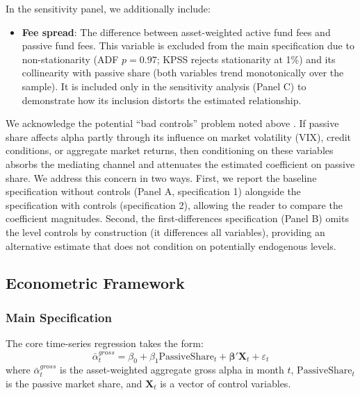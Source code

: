 \documentclass[11pt, a4paper]{article}
\begin{document}
In the sensitivity panel, we additionally include:
\begin{itemize}[noitemsep]
    \item \textbf{Fee spread}: The difference between asset-weighted active fund fees and passive fund fees. This variable is excluded from the main specification due to non-stationarity (ADF $p = 0.97$; KPSS rejects stationarity at 1\%) and its collinearity with passive share (both variables trend monotonically over the sample). It is included only in the sensitivity analysis (Panel C) to demonstrate how its inclusion distorts the estimated relationship.
\end{itemize}

We acknowledge the potential ``bad controls'' problem noted above \parencite{angrist2009}. If passive share affects alpha partly through its influence on market volatility (VIX), credit conditions, or aggregate market returns, then conditioning on these variables absorbs the mediating channel and attenuates the estimated coefficient on passive share. We address this concern in two ways. First, we report the baseline specification without controls (Panel A, specification 1) alongside the specification with controls (specification 2), allowing the reader to compare the coefficient magnitudes. Second, the first-differences specification (Panel B) omits the level controls by construction (it differences all variables), providing an alternative estimate that does not condition on potentially endogenous levels.

\subsection{Econometric Framework}
\label{subsec:econometrics}

\subsubsection{Main Specification}

The core time-series regression takes the form:
\begin{equation}
    \bar{\alpha}_{t}^{gross} = \beta_0 + \beta_1 \text{PassiveShare}_t + \boldsymbol{\beta}' \mathbf{X}_t + \varepsilon_t
    \label{eq:main_regression}
\end{equation}
where $\bar{\alpha}_{t}^{gross}$ is the asset-weighted aggregate gross alpha in month $t$, $\text{PassiveShare}_t$ is the passive market share, and $\mathbf{X}_t$ is a vector of control variables.
\end{document}
